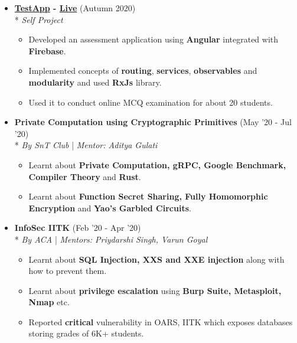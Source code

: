 \documentclass{article}
\begin{document}
\renewcommand\labelitemii{$\circ$}

\begin{itemize}[topsep=8pt,itemsep=3pt, partopsep =2pt, parsep =3pt]
    \item \textbf{\href{https://github.com/SarthakRout/TestApp}{TestApp} - \href{http://baluate-74386.web.app/}{Live}}
    \hfill {(Autumn 2020)}
    \\*
    \textit{Self Project}
    \vspace{-2mm}
    \begin{itemize}
        \item Developed an assessment application using \textbf{Angular} integrated with \textbf{Firebase}.
        \item Implemented concepts of \textbf{routing}, \textbf{services}, \textbf{observables} and \textbf{modularity} and used \textbf{RxJs} library.
        \item Used it to conduct online MCQ examination  for about 20 students.
    \end{itemize}
    \vspace{-2mm}
    \item \textbf{Private Computation using Cryptographic Primitives} \hfill {(May  '20 - Jul '20)} \\* \textit{By SnT Club} | \textit{Mentor: Aditya Gulati }
    \vspace{-2mm}
    \begin{itemize}
        \item Learnt about \textbf{Private Computation, gRPC, Google Benchmark, Compiler Theory} and \textbf{Rust}.
        \item Learnt about \textbf{Function Secret Sharing, Fully Homomorphic Encryption} and \textbf{ Yao's Garbled Circuits}.
    \end{itemize}
    \vspace{-2mm}
    \item \textbf{InfoSec IITK} \hfill {(Feb '20 - Apr '20)} \\* \textit{By ACA} | \textit{Mentors: Priydarshi Singh, Varun Goyal}
    \vspace{-2mm}
    \begin{itemize}
        \item Learnt about \textbf{SQL Injection, XXS and XXE injection} along with how to prevent them.
        \item Learnt about \textbf{privilege escalation} using \textbf{Burp Suite, Metasploit, Nmap} etc. 
        \item Reported \textbf{critical} vulnerability in OARS, IITK which exposes databases storing grades of 6K+ students.

\end{itemize}
\end{itemize}
\end{document}
